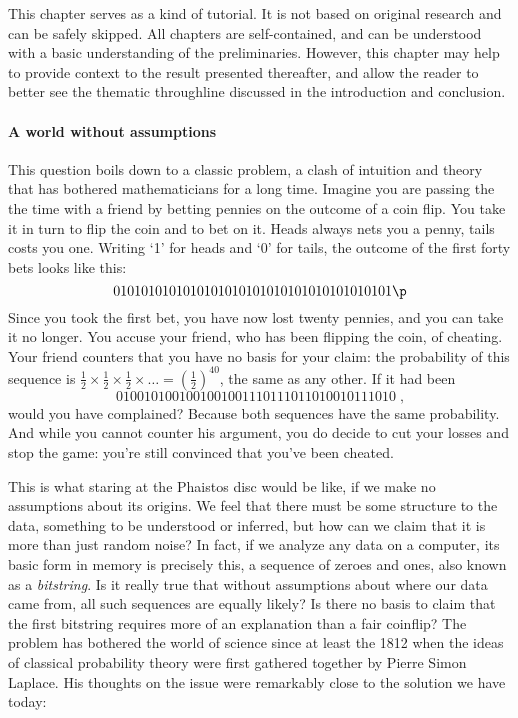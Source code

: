 \begin{summary}
This chapter serves as a kind of tutorial. It is not based on original research and can be safely skipped. All chapters are self-contained, and can be understood with a basic understanding of the preliminaries. However, this chapter may help to provide context to the result presented thereafter, and allow the reader to better see the thematic throughline discussed in the introduction and conclusion. 
\end{summary}




\paragraph{A world without assumptions}

This question boils down to a classic problem, a clash of intuition and theory that has bothered mathematicians for a long time. Imagine you are passing the the time with a friend by betting pennies on the outcome of a coin flip. You take it in turn to flip the coin and to bet on it. Heads always nets you a penny, tails costs you one. Writing `1' for heads and `0' for tails, the outcome of the first forty bets looks like this:
\[
0101010101010101010101010101010101010101 \p
\]   
Since you took the first bet, you have now lost twenty pennies, and you can take it no longer. You accuse your friend, who has been flipping the coin, of cheating. Your friend counters that you have no basis for your claim: the probability of this sequence is $\frac{1}{2} \times \frac{1}{2} \times \frac{1}{2} \times \ldots = \left(\frac{1}{2}\right)^{40}$, the same as any other. If it had been 
\[
0100101001001001001110111011010010111010 \;\text{,}
\]
would you have complained? Because both sequences have the same probability. And while you cannot counter his argument, you do decide to cut your losses and stop the game: you're still convinced that you've been cheated.

This is what staring at the Phaistos disc would be like, if we make no assumptions about its origins. We feel that there must be some structure  to the data, something to be understood or inferred, but how can we claim that it is more than just random noise? In fact, if we analyze any data on a computer, its basic form in memory is precisely this, a sequence of zeroes and ones, also known as a \emph{bitstring}. Is it really true that without assumptions about where our data came from, all such sequences are equally likely? Is there no basis to claim that the first bitstring requires more of an explanation than a fair coinflip? The problem has bothered the world of science since at least the 1812 when the ideas of classical probability theory were first gathered together by Pierre Simon Laplace. His thoughts on the issue were remarkably close to the solution we have today:

